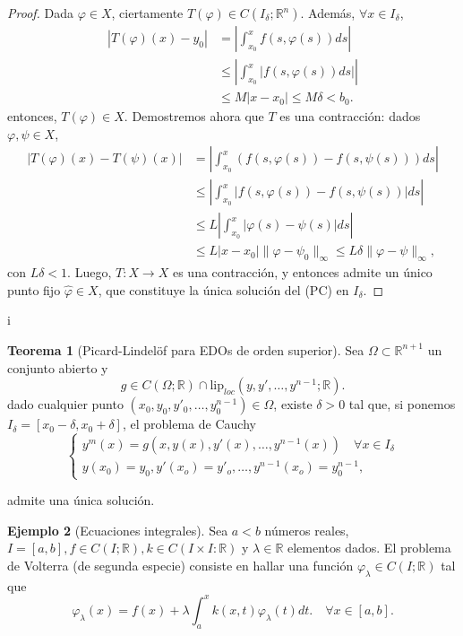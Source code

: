 \documentclass[11pt]{article}
\theoremstyle{definition} %
\newtheorem{theorem}{Teorema}[section]
\newtheorem{example}[theorem]{Ejemplo}
\newcommand{\R}{\mathbb{R}}
\begin{document}
\begin{proof}
	\noindent Dada $\varphi \in X$, ciertamente $T(\varphi) \in C(I_{\delta};\R^n)$. Además, $\forall x \in I_{\delta}$,
	\begin{align*}
		|T(\varphi)(x)-y_{0}| & = \left| \int_{x_{0}}^{x} f(s,\varphi(s))ds \right| \\ 
		& \leq \left| \int_{x_{0}}^{x} |f(s,\varphi(s))ds| \right| \\
		& \leq M |x-x_{0}| \leq M\delta < b_0
	.\end{align*}
	entonces, $T(\varphi) \in X$.
	Demostremos ahora que $T$ es una contracción: dados $\varphi,\psi \in X$, 
	\begin{align*}
		|T(\varphi)(x)-T(\psi)(x)| & = \left| \int_{x_{0}}^{x} (f(s,\varphi(s))-f(s,\psi(s)))ds \right| \\
		& \leq \left| \int_{x_{0}}^{x} |f(s,\varphi(s))-f(s,\psi(s))| ds \right| \\
		& \leq L \left| \int_{x_{0}}^{x}|\varphi(s)-\psi(s)|ds \right| \\
		& \leq L|x-x_{0}| \| \varphi - \psi_0 \|_{\infty} \leq L \delta \| \varphi - \psi \|_{\infty},
	\end{align*}
	con $L\delta<1$. Luego, $T: X \to X$ es una contracción, y entonces admite un único punto fijo $\hat{\varphi} \in X$, que constituye la única solución del (PC) en $I_{\delta}$. 
\end{proof}
 
i\begin{theorem}[Picard-Lindelöf para EDOs de orden superior]
  Sea $\Omega \subset \R^{n+1}$ un conjunto abierto y 
  \[g \in C(\Omega;\R)\cap \text{lip}_{\textit{loc}}(y,y',\ldots, y^{n-1};\R).\] 
  dado cualquier punto $(x_0,y_0,y'_0,\ldots,y_0^{n-1})\in \Omega$, existe $\delta > 0$ tal que, si ponemos $I_{\delta}=[x_0 -\delta, x_0+ \delta]$, el problema de Cauchy
  \[
    \begin{cases}
      y^{m}(x)=g(x,y(x),y'(x),\ldots,y^{n-1}(x)) \quad \forall x \in I_{\delta} \\
      y(x_0)=y_0, y'(x_o)=y'_o,\ldots, y^{n-1}(x_o)=y_0^{n-1},
    \end{cases}
  \]
       
  admite una única solución.

\end{theorem}

\begin{example}[Ecuaciones integrales] 
    Sea $a<b$ números reales, $I=[a,b], f\in C(I;\R), k\in C(I\times I:\R)$ y $\lambda \in \R$ elementos dados. El problema de Volterra (de segunda especie) consiste en hallar una función $\varphi_{\lambda}\in C(I;\R)$ tal que 
  \[
    \varphi_{\lambda}(x)=f(x)+\lambda\int_{a}^{x}k(x,t)\varphi_{\lambda}(t)dt.\quad \forall x \in [a,b].
  \]
\end{example}
\end{document}
